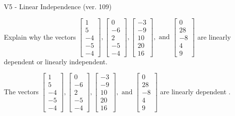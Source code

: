 \begin{exercise}
  \begin{exerciseTitle}V5 - Linear Independence (ver. 109)\end{exerciseTitle}
  \begin{exerciseStatement}
    Explain why the vectors \(\left[\begin{array}{r}
1 \\
5 \\
-4 \\
-5 \\
-4
\end{array}\right] , \left[\begin{array}{r}
0 \\
-6 \\
2 \\
-5 \\
-4
\end{array}\right] , \left[\begin{array}{r}
-3 \\
-9 \\
10 \\
20 \\
16
\end{array}\right] , \text{ and } \left[\begin{array}{r}
0 \\
28 \\
-8 \\
4 \\
9
\end{array}\right]\) are linearly dependent or linearly independent.	


  \end{exerciseStatement}
  \begin{exerciseAnswer}
   The vectors \(\left[\begin{array}{r}
1 \\
5 \\
-4 \\
-5 \\
-4
\end{array}\right] , \left[\begin{array}{r}
0 \\
-6 \\
2 \\
-5 \\
-4
\end{array}\right] , \left[\begin{array}{r}
-3 \\
-9 \\
10 \\
20 \\
16
\end{array}\right] , \text{ and } \left[\begin{array}{r}
0 \\
28 \\
-8 \\
4 \\
9
\end{array}\right]\) are 
  	 linearly dependent  .
  


  \end{exerciseAnswer}
\end{exercise}